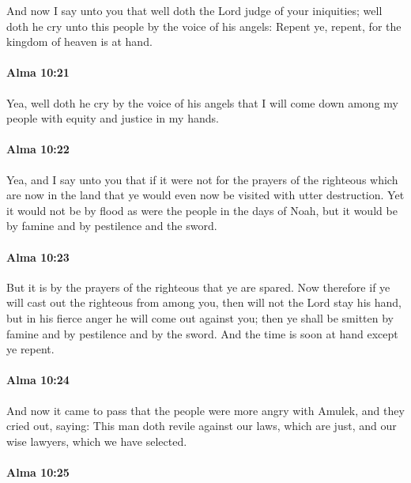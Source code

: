			And now I say unto you
			that well doth the Lord judge of your iniquities;
			well doth he cry unto this people by the voice of his angels:
			Repent ye, repent, for the kingdom of heaven is at hand.

		\paragraph{Alma 10:21} %
			\label{ALMA-10-21}

			Yea, well doth he cry by the voice of his angels
			that I will come down among my people with equity and justice in my hands.

		\paragraph{Alma 10:22} %
			\label{ALMA-10-22}

			Yea, and I say unto you that
			if it were not for the prayers of the righteous which are now in the land
			that ye would even now be visited with utter destruction.
			Yet it would not be by flood as were the people in the days of Noah,
			but it would be by famine and by pestilence and the sword.

		\paragraph{Alma 10:23} %
			\label{ALMA-10-23}

			But it is by the prayers of the righteous that ye are spared.
			Now therefore if ye will cast out the righteous from among you,
			then will not the Lord stay his hand,
			but in his fierce anger he will come out against you;
			then ye shall be smitten by famine and by pestilence and by the sword.
			And the time is soon at hand except ye repent.

		\paragraph{Alma 10:24} %
			\label{ALMA-10-24}

			And now it came to pass that the people were more angry with Amulek,
			and they cried out, saying:
			This man doth revile against our laws, which are just,
			and our wise lawyers, which we have selected.

		\paragraph{Alma 10:25} %
			\label{ALMA-10-25}

